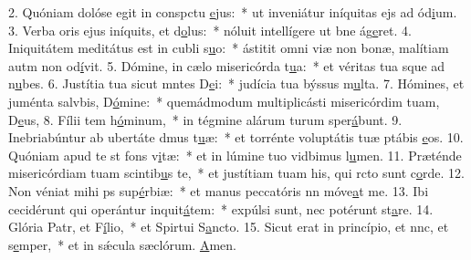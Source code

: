 2. Quóniam dolóse egit in conspctu \uline{e}jus:~* ut inveniátur iníquitas ejs ad ód\uline{i}um.
3. Verba oris ejus iníquits, et d\uline{o}lus:~* nóluit intellígere ut bne ág\uline{e}ret.
4. Iniquitátem meditátus est in cubli s\uline{u}o:~* ástitit omni viæ non bonæ, malítiam autm non od\uline{í}vit.
5. Dómine, in cælo misericórda t\uline{u}a:~* et véritas tua sque ad n\uline{u}bes.
6. Justítia tua sicut mntes D\uline{e}i:~* judícia tua býssus m\uline{u}lta.
7. Hómines, et juménta salvbis, D\uline{ó}mine:~* quemádmodum multiplicásti misericórdim tuam, D\uline{e}us,
8. Fílii tem h\uline{ó}minum,~* in tégmine alárum turum sper\uline{á}bunt.
9. Inebriabúntur ab ubertáte dmus t\uline{u}æ:~* et torrénte voluptátis tuæ ptábis \uline{e}os.
10. Quóniam apud te st fons v\uline{i}tæ:~* et in lúmine tuo vidbimus l\uline{u}men.
11. Præténde misericórdiam tuam scintib\uline{u}s te,~* et justítiam tuam his, qui rcto sunt c\uline{o}rde.
12. Non véniat mihi ps sup\uline{é}rbiæ:~* et manus peccatóris nn móve\uline{a}t me.
13. Ibi cecidérunt qui operántur inquit\uline{á}tem:~* expúlsi sunt, nec potérunt st\uline{a}re.
14. Glória Patr, et F\uline{í}lio,~* et Spirtui S\uline{a}ncto.
15. Sicut erat in princípio, et nnc, et s\uline{e}mper,~* et in sǽcula sæclórum. \uline{A}men.
